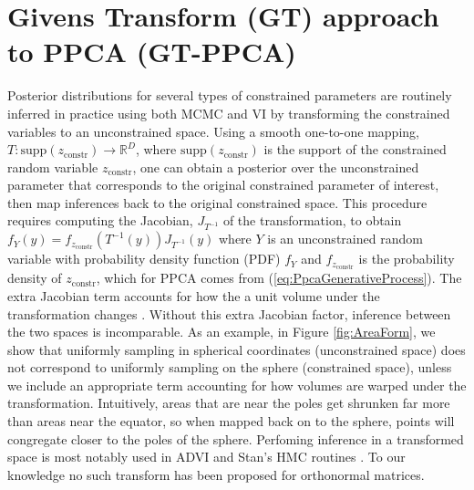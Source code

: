 \documentclass{article}
\begin{document}
\section{Givens Transform (GT) approach to PPCA (GT-PPCA)} \label{Givens}


Posterior distributions for several types of constrained parameters are routinely inferred in practice using both MCMC and VI by transforming the constrained variables to an unconstrained space. Using a smooth one-to-one mapping, $T: \mathrm{supp}(z_\mathrm{constr}) \to \mathbb{R}^D$, where $\mathrm{supp}(z_\mathrm{constr})$ is the support of the constrained random variable $z_\mathrm{constr}$, one can obtain a posterior over the unconstrained parameter that corresponds to the original constrained parameter of interest, then map inferences back to the original constrained space. This procedure requires computing the Jacobian, $J_{T^{-1}}$ of the transformation, to obtain $f_{Y}(y) = f_{z_\mathrm{constr}}(T^{-1}(y)) J_{T^{-1}}(y)$ where $Y$ is an unconstrained random variable with probability density function (PDF) $f_Y$ and $f_{z_\mathrm{constr}}$ is the probability density of $z_\mathrm{constr}$, which for PPCA comes from (\ref{eq:PpcaGenerativeProcess}). The extra Jacobian term accounts for how the a unit volume under the transformation changes \citep{kucukelbir2014fully}. Without this extra Jacobian factor, inference between the two spaces is incomparable. As an  example, in Figure \ref{fig:AreaForm}, we show that uniformly sampling in spherical coordinates (unconstrained space) does not correspond to uniformly sampling on the sphere (constrained space), unless we include an appropriate term accounting for how volumes are warped under the transformation. Intuitively, areas that are near the poles get shrunken far more than areas near the equator, so when mapped back on to the sphere, points will congregate closer to the poles of the sphere. Perfoming inference in a transformed space is most notably used in ADVI and Stan's HMC routines \citep{carpenter2016stan, kucukelbir2014fully}. To our knowledge no such transform has been proposed for orthonormal matrices.
\end{document}
